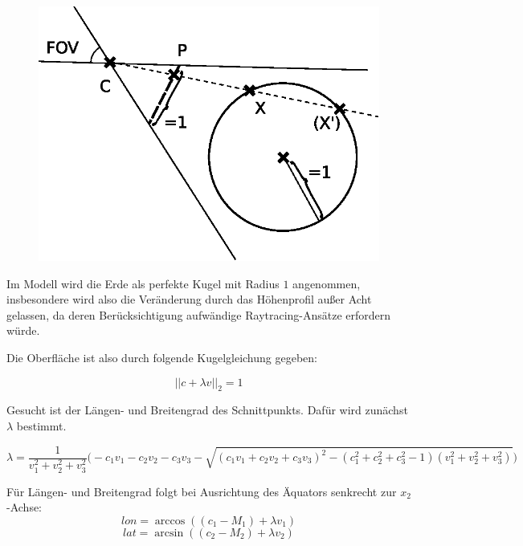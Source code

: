 \documentclass[10pt]{scrreprt}
\begin{document}
\begin{figure}
\includegraphics[scale=0.75]{algo/SchnittKugel.eps}
\end{figure}

Im Modell wird die Erde als perfekte Kugel mit Radius $1$ angenommen, insbesondere wird also die Veränderung durch das Höhenprofil außer Acht gelassen, da deren Berücksichtigung aufwändige Raytracing-Ansätze erfordern würde.

Die Oberfläche ist also durch folgende Kugelgleichung gegeben:

\[||c+\lambda v||_2 = 1\]

Gesucht ist der Längen- und Breitengrad des Schnittpunkts. Dafür wird zunächst $\lambda$ bestimmt.


\newpage
\vspace{7mm}
\begin{equation*}
\lambda = \frac{1}{v_1^2+v_2^2+v_3^2}\Big(-c_1v_1-c_2v_2-c_3v_3
-\sqrt{\left(c_1v_1+c_2v_2+c_3v_3\right)^2-(c_1^2+c_2^2+c_3^2-1)(v_1^2+v_2^2+v_3^2)}\Big)
\end{equation*}

Für Längen- und Breitengrad folgt bei Ausrichtung des Äquators senkrecht zur $x_2$-Achse:
\[lon = \arccos((c_1-M_1)+\lambda v_1)\]
\[lat = \arcsin((c_2-M_2)+\lambda v_2)\]
\end{document}

